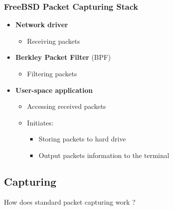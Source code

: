 \documentclass{beamer}
\begin{document}
\begin{frame}
\frametitle{FreeBSD Packet Capturing Stack}
\begin{itemize}
	\item \textbf{Network driver}
		\begin{itemize}
			\item Receiving packets\newline
		\end{itemize}
	\item \textbf{Berkley Packet Filter} (BPF)
		\begin{itemize}
			\item Filtering packets\newline
		\end{itemize}
	\item \textbf{User-space application}
		\begin{itemize}
			\item Accessing received packets
			\item Initiates:
				\begin{itemize}
					\item Storing packets to hard drive
					\item Output packets information to the terminal
				\end{itemize}
		\end{itemize}
\end{itemize}
\end{frame}

\subsection*{Capturing}
\begin{frame}
	\begin{center}
	\huge{How does standard packet capturing work ?}
	\end{center}
\end{frame}
\end{document}
